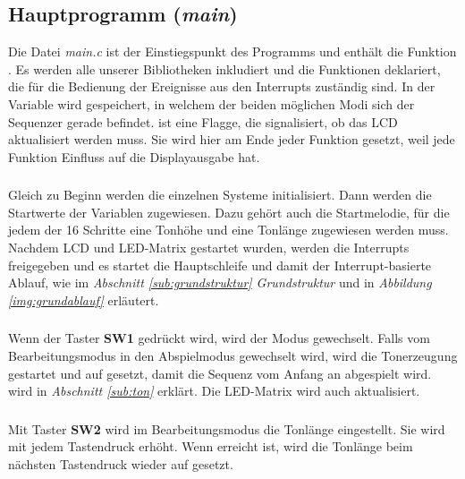 \subsection{Hauptprogramm (\emph{main})}
Die Datei \textsl{main.c} ist der Einstiegspunkt des Programms und enthält die Funktion . Es werden alle unserer Bibliotheken inkludiert und die Funktionen deklariert, die für die Bedienung der Ereignisse aus den Interrupts zuständig sind. In der Variable  wird gespeichert, in welchem der beiden möglichen Modi sich der Sequenzer gerade befindet.
\newline
{} ist eine Flagge, die signalisiert, ob das LCD aktualisiert werden muss. Sie wird hier am Ende jeder Funktion gesetzt, weil jede Funktion Einfluss auf die Displayausgabe hat.

\subsubsection{} %
\label{ssub:int main}
Gleich zu Beginn werden die einzelnen Systeme initialisiert. Dann werden die Startwerte der Variablen zugewiesen. Dazu gehört auch die Startmelodie, für die jedem der 16 Schritte eine Tonhöhe und eine Tonlänge zugewiesen werden muss. Nachdem LCD und LED-Matrix gestartet wurden, werden die Interrupts freigegeben und es startet die Hauptschleife und damit der Interrupt-basierte Ablauf, wie im \textsl{Abschnitt \ref{sub:grundstruktur} Grundstruktur} und in \textsl{Abbildung \ref{img:grundablauf}} erläutert.

\subsubsection{} %
\label{ssub:void_button_sw1_pressed}
Wenn der Taster \textbf{SW1} gedrückt wird, wird der Modus gewechselt. Falls vom Bearbeitungsmodus in den Abspielmodus gewechselt wird, wird die Tonerzeugung gestartet und  auf  gesetzt, damit die Sequenz vom Anfang an abgespielt wird.  wird in \textsl{Abschnitt \ref{sub:ton}} erklärt. Die LED-Matrix wird auch aktualisiert.

\subsubsection{} %
\label{ssub:void_button_sw2_pressed}
Mit Taster \textbf{SW2} wird im Bearbeitungsmodus die Tonlänge eingestellt. Sie wird mit jedem Tastendruck erhöht.
\newline
Wenn  erreicht ist, wird die Tonlänge beim nächsten Tastendruck wieder auf  gesetzt.


